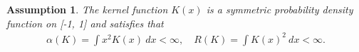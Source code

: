 \documentclass[12pt]{article}
\newtheorem{prop}{Proposition}
\newtheorem{assump}{Assumption}
\begin{document}
  \begin{assump}
  \label{assum_kernel} 
  The kernel function $K(x)$ is a symmetric probability density function on [-1, 1] and satisfies that
  \begin{eqnarray}\label{eq:kernel quantity}
  \alpha(K)=\int x^2K(x) \ dx<\infty,\quad R(K)=\int K(x)^2 \ dx<\infty.
  \end{eqnarray}
  \end{assump}

    


\end{document}
